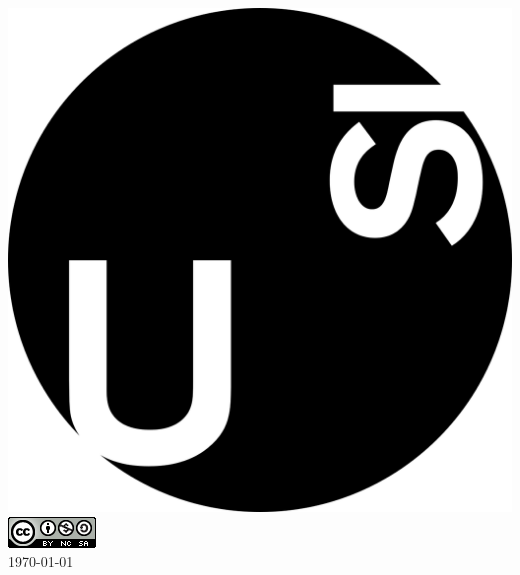\documentclass[12pt]{article}
\begin{document}
{\includegraphics[scale=0.08]{images/usi-logo.png}\\[2cm] %


\includegraphics[scale=0.4]{images/copyright.png}\\[1cm]


{\large \today}\\[2cm] %
}
\newpage


\tableofcontents

\newpage














\end{document}
